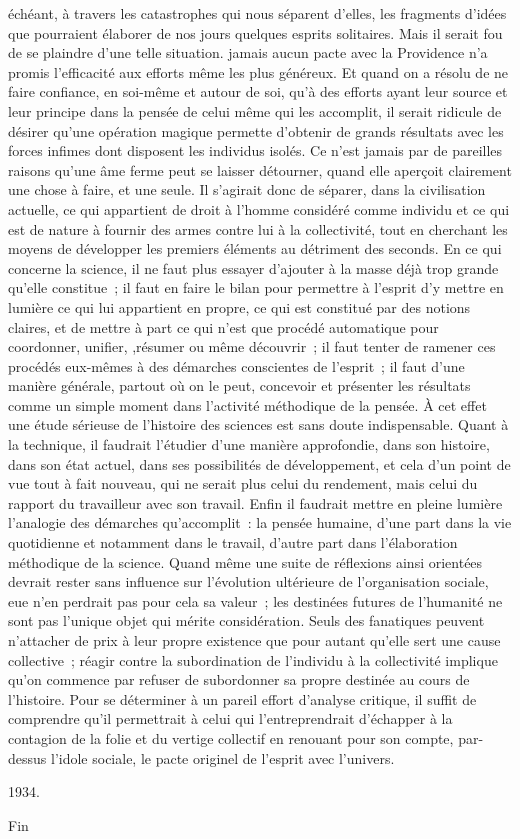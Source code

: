 \documentclass[french,twoside]{book} %
\begin{document}
échéant, à travers les catastrophes qui nous séparent d'elles, les fragments d'idées que pourraient élaborer de nos jours quelques esprits solitaires. Mais il serait fou de se plaindre d'une telle situation. jamais aucun pacte avec la Providence n'a promis l'efficacité aux efforts même les plus généreux. Et quand on a résolu de ne faire confiance, en soi-même et autour de soi, qu'à des efforts ayant leur source et leur principe dans la pensée de celui même qui les accomplit, il serait ridicule de désirer qu'une opération magique permette d'obtenir de grands résultats avec les forces infimes dont disposent les individus isolés. Ce n'est jamais par de pareilles raisons qu'une âme ferme peut se laisser détourner, quand elle aperçoit clairement une chose à faire, et une seule. Il s'agirait donc de séparer, dans la civilisation actuelle, ce qui appartient de droit à l'homme considéré comme individu et ce qui est de nature à fournir des armes contre lui à la collectivité, tout en cherchant les moyens de développer les premiers éléments au détriment des seconds. En ce qui concerne la science, il ne faut plus essayer d'ajouter à la masse déjà trop grande qu'elle constitue ; il faut en faire le bilan pour permettre à l'esprit d'y mettre en lumière ce qui lui appartient en propre, ce qui est constitué par des notions claires, et de mettre à part ce qui n'est que procédé automatique pour coordonner, unifier, ,résumer ou même découvrir ; il faut tenter de ramener ces procédés eux-mêmes à des démarches conscientes de l'esprit ; il faut d'une manière générale, partout où on le peut, concevoir et présenter les résultats comme un simple moment dans l'activité méthodique de la pensée. À cet effet une étude sérieuse de l'histoire des sciences est sans doute indispensable. Quant à la technique, il faudrait l'étudier d'une manière approfondie, dans son histoire, dans son état actuel, dans ses possibilités de développement, et cela d'un point de vue tout à fait nouveau, qui ne serait plus celui du rendement, mais celui du rapport du travailleur avec son travail. Enfin il faudrait mettre en pleine lumière l'analogie des démarches qu'accomplit : la pensée humaine, d'une part dans la vie quotidienne et notamment dans le travail, d'autre part dans l'élaboration méthodique de la science. Quand même une suite de réflexions ainsi orientées devrait rester sans influence sur l'évolution ultérieure de l'organisation sociale, eue n'en perdrait pas pour cela sa valeur ; les destinées futures de l'humanité ne sont pas l'unique objet qui mérite considération. Seuls des fanatiques peuvent n'attacher de prix à leur propre existence que pour autant qu'elle sert une cause collective ; réagir contre la subordination de l'individu à la collectivité implique qu'on commence par refuser de subordonner sa propre destinée au cours de l'histoire. Pour se déterminer à un pareil effort d'analyse critique, il suffit de comprendre qu'il permettrait à celui qui l'entreprendrait d'échapper à la contagion de la folie et du vertige collectif en renouant pour son compte, par-dessus l'idole sociale, le pacte originel de l'esprit avec l'univers.\par
1934.\par
Fin
 
\end{document}
